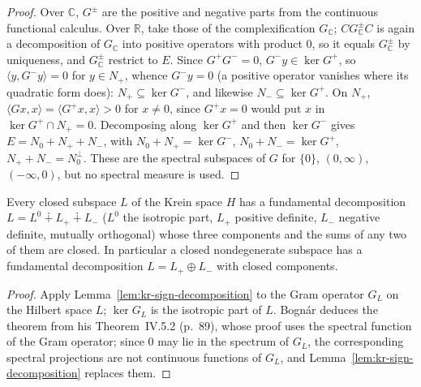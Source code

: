 \begin{proof}
  \leanok
  Over $\mathbb{C}$, $G^\pm$ are the positive and negative parts from the continuous functional
  calculus. Over $\mathbb{R}$, take those of the complexification $G_{\mathbb{C}}$; $C G_{\mathbb{C}}^\pm C$
  is again a decomposition of $G_{\mathbb{C}}$ into positive operators with product $0$, so it
  equals $G_{\mathbb{C}}^\pm$ by uniqueness, and $G_{\mathbb{C}}^\pm$ restrict to $E$. Since
  $G^+ G^- = 0$, $G^- y \in \ker G^+$, so $\langle y, G^- y\rangle = 0$ for $y \in N_+$, whence
  $G^- y = 0$ (a positive operator vanishes where its quadratic form does): $N_+ \subseteq \ker G^-$,
  and likewise $N_- \subseteq \ker G^+$. On $N_+$, $\langle Gx, x\rangle = \langle G^+x, x\rangle > 0$
  for $x \ne 0$, since $G^+ x = 0$ would put $x$ in $\ker G^+ \cap N_+ = 0$. Decomposing along
  $\ker G^+$ and then $\ker G^-$ gives $E = N_0 + N_+ + N_-$, with $N_0 + N_+ = \ker G^-$,
  $N_0 + N_- = \ker G^+$, $N_+ + N_- = N_0^\perp$. These are the spectral subspaces of $G$ for
  $\{0\}$, $(0, \infty)$, $(-\infty, 0)$, but no spectral measure is used.
\end{proof}

\begin{theorem}
  \label{thm:kr-krein-v31}
  \leanok
  Every closed subspace $L$ of the Krein space $H$ has a fundamental decomposition
  $L = L^0 \dotplus L_+ \dotplus L_-$ \cite[\S I.11, p.~24]{Bog74} ($L^0$ the isotropic part, $L_+$
  positive definite, $L_-$ negative definite, mutually orthogonal) whose three components and the
  sums of any two of them are closed. In particular a closed nondegenerate subspace has a
  fundamental decomposition $L = L_+ \oplus L_-$ with closed components.
\end{theorem}

\begin{proof}
  \leanok
  Apply Lemma~\ref{lem:kr-sign-decomposition} to the Gram operator $G_L$ on the Hilbert space $L$;
  $\ker G_L$ is the isotropic part of $L$. Bognár deduces the theorem from his Theorem~IV.5.2
  (p.~89), whose proof uses the spectral function of the Gram operator; since $0$ may lie in the
  spectrum of $G_L$, the corresponding spectral projections are not continuous functions of $G_L$,
  and Lemma~\ref{lem:kr-sign-decomposition} replaces them.
\end{proof}

